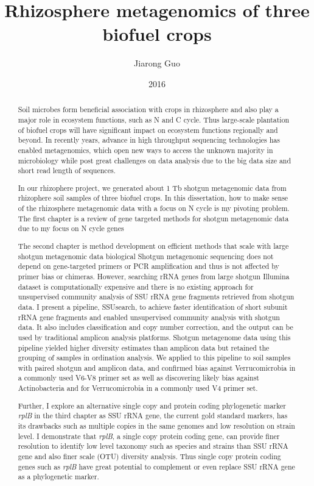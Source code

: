 \documentclass[]{msu-thesis}
\title{Rhizosphere metagenomics of three biofuel crops}
\author{Jiarong Guo}
\date{2016}
\begin{document}
\frontmatter
\maketitlepage
\begin{abstract}
Soil microbes form beneficial association with crops in rhizosphere and also play a major role in ecosystem functions, such as N and C cycle. Thus large-scale plantation of biofuel crops will have significant impact on ecosystem functions regionally and beyond.
In recently years, advance in high throughput sequencing technologies has enabled metagenomics, which open new ways to access the unknown majority in microbiology while post great challenges on data analysis due to the big data size and short read length of sequences. 

In our rhizophere project, we generated about 1 Tb shotgun metagenomic data from rhizophere soil samples of three biofuel crops.  
In this dissertation, how to make sense of the rhizosphere metagenomic data with a focus on N cycle is my pivoting problem. The first chapter is a review of gene targeted methods for shotgun metagenomic data due to my focus on N cycle genes

The second chapter is method development on efficient methods that scale with large shotgun metagenomic data biological 
Shotgun metagenomic sequencing does not depend on gene-targeted primers or PCR amplification and thus is not affected by primer bias or chimeras. However, searching rRNA genes from large shotgun Illumina dataset is computationally expensive and there is no existing approach for unsupervised community analysis of SSU rRNA gene fragments retrieved from shotgun data. I present a pipeline, SSUsearch, to achieve faster identification of short subunit rRNA gene fragments and enabled unsupervised community analysis with shotgun data. It also includes classification and copy number correction, and the output can be used by traditional amplicon analysis platforms. Shotgun metagenome data using this pipeline yielded higher diversity estimates than amplicon data but retained the grouping of samples in ordination analysis. We applied to this pipeline to soil samples with paired shotgun and amplicon data, and confirmed bias against Verrucomicrobia in a commonly used V6-V8 primer set as well as discovering likely bias against Actinobacteria and for Verrucomicrobia in a commonly used V4 primer set.

Further, I explore an alternative single copy and protein coding phylogenetic marker \textit{rplB} in the third chapter as SSU rRNA gene, the current gold standard markers, has its drawbacks such as multiple copies in the same genomes and low resolution on strain level. I demonstrate that \textit{rplB}, a single copy protein coding gene, can provide finer resolution to identify low level taxonomy such as species and strains than SSU rRNA gene and also finer scale (OTU) diversity analysis. Thus single copy protein coding genes such as \textit{rplB} have great potential to complement or even replace SSU rRNA gene as a phylogenetic marker. 


\end{abstract}
\end{document}
